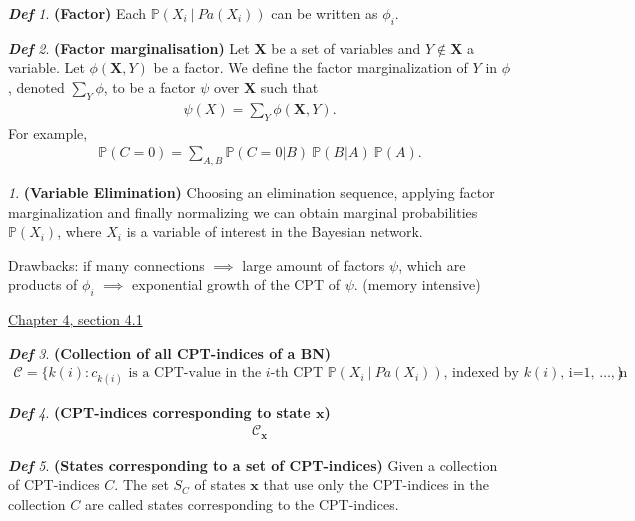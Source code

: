 \documentclass{amsart}
\newcommand{\bfx}{{\mathbf{x}}}
\newcommand{\bfX}{{\mathbf{X}}}
\theoremstyle{plain}
\theoremstyle{remark}
\newtheorem*{remark*}{}
\newtheorem*{definition*}{\textbf{\em Def}}
\theoremstyle{plain}
\renewcommand{\P}{{\mathbb P}}
\newcommand{\C}{{\mathcal C}}
\newcommand{\vs}{\vspace{0.75pc}}
\begin{document}
\begin{definition*}\textbf{ (Factor) }
Each $ \P(X_i\ |\ Pa(X_i))$ can be written as $\phi_i$.
\end{definition*}\vs

\begin{definition*}\textbf{ (Factor marginalisation) }
Let $\bfX$ be a set of variables and $Y \notin \bfX$ a variable. Let $\phi(\bfX,Y)$ be a factor. We define the factor marginalization of $Y$ in $\phi$, denoted $\sum_Y \phi$, to be a factor $\psi$ over $\bfX$ such that
\begin{align*}
\psi(X) = \sum_Y \phi(\bfX,Y).
\end{align*}
For example,
\begin{align*}
\P(C=0) = \sum_{A,B} \P(C=0 | B)\  \P(B | A)\ \P(A).
\end{align*}
\end{definition*}\vs

\begin{remark*}\textbf{(Variable Elimination)}
Choosing an elimination sequence, applying factor marginalization and finally normalizing we can obtain marginal probabilities $\P(X_i)$, where $X_i$ is a variable of interest in the Bayesian network.\vs

Drawbacks: if many connections $\implies$ large amount of factors $\psi$, which are products of $\phi_i$ $\implies$ exponential growth of the CPT of $\psi$. (memory intensive)
\end{remark*}\vs

\underline{Chapter 4, section 4.1} \\
\begin{definition*}\textbf{ (Collection of all CPT-indices of a BN) }
\begin{align*}
\C = \{ k(i): c_{k(i)} \text{ is a CPT-value in the $i$-th CPT $\P(X_i\ |\ Pa(X_i))$, indexed by $k(i)$, i=1, \ldots , n } \}
\end{align*}\vs
\end{definition*}\vs

\begin{definition*}\textbf{ (CPT-indices corresponding to state $\mathbf{x}$) }\begin{align*}
\C_\bfx
\end{align*}\vs
\end{definition*}\vs 

\begin{definition*}\textbf{ (States corresponding to a set of CPT-indices) }
Given a collection of CPT-indices $C$. The set $S_C$ of states $\bfx$ that use only the CPT-indices in the collection $C$ are called states corresponding to the CPT-indices.
\end{definition*}\vs 
\end{document}
